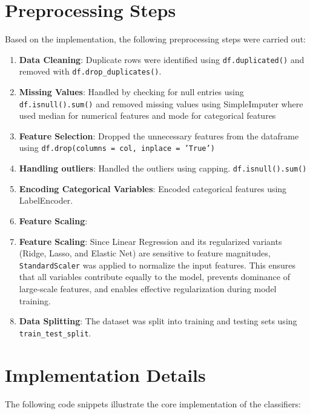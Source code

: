 \documentclass[11pt]{article}
\begin{document}
\section{Preprocessing Steps}
Based on the implementation, the following preprocessing steps were carried out:
\begin{enumerate}
    \item \textbf{Data Cleaning}: Duplicate rows were identified using \texttt{df.duplicated()} and removed with \texttt{df.drop\_duplicates()}.
    
    \item \textbf{Missing Values}: Handled by checking for null entries using \texttt{df.isnull().sum()} and removed missing values using SimpleImputer where used median for numerical features and mode for categorical features
    
    \item \textbf{Feature Selection}: Dropped the unnecessary features from the dataframe using \texttt{df.drop(columns = col, inplace = 'True')}
    
    \item \textbf{Handling outliers}: Handled the outliers using capping. \texttt{df.isnull().sum()}

    \item \textbf{Encoding Categorical Variables}: Encoded categorical features using LabelEncoder.
    
    \item \textbf{Feature Scaling}: \item \textbf{Feature Scaling}:  
    Since Linear Regression and its regularized variants (Ridge, Lasso, and Elastic Net) are sensitive to feature magnitudes, \texttt{StandardScaler} was applied to normalize the input features. This ensures that all variables contribute equally to the model, prevents dominance of large-scale features, and enables effective regularization during model training.

    
    \item \textbf{Data Splitting}: The dataset was split into training and testing sets using \texttt{train\_test\_split}.
\end{enumerate}

\section{Implementation Details}
The following code snippets illustrate the core implementation of the classifiers:
\end{document}
